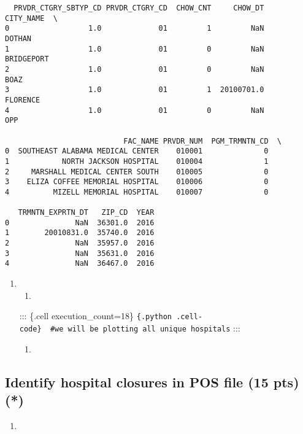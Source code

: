 \documentclass[
  letterpaper,
  DIV=11,
  numbers=noendperiod]{scrartcl}
\providecommand{\tightlist}{%
  \setlength{\itemsep}{0pt}\setlength{\parskip}{0pt}}\usepackage{longtable,booktabs,array}
\begin{document}
\begin{verbatim}
  PRVDR_CTGRY_SBTYP_CD PRVDR_CTGRY_CD  CHOW_CNT     CHOW_DT   CITY_NAME  \
0                  1.0             01         1         NaN      DOTHAN   
1                  1.0             01         0         NaN  BRIDGEPORT   
2                  1.0             01         0         NaN        BOAZ   
3                  1.0             01         1  20100701.0    FLORENCE   
4                  1.0             01         0         NaN         OPP   

                           FAC_NAME PRVDR_NUM  PGM_TRMNTN_CD  \
0  SOUTHEAST ALABAMA MEDICAL CENTER    010001              0   
1            NORTH JACKSON HOSPITAL    010004              1   
2     MARSHALL MEDICAL CENTER SOUTH    010005              0   
3    ELIZA COFFEE MEMORIAL HOSPITAL    010006              0   
4          MIZELL MEMORIAL HOSPITAL    010007              0   

   TRMNTN_EXPRTN_DT   ZIP_CD  YEAR  
0               NaN  36301.0  2016  
1        20010831.0  35740.0  2016  
2               NaN  35957.0  2016  
3               NaN  35631.0  2016  
4               NaN  36467.0  2016  
\end{verbatim}

\begin{enumerate}
\def\labelenumi{\arabic{enumi}.}
\setcounter{enumi}{3}
\item
  \begin{enumerate}
  \def\labelenumii{\alph{enumii}.}
  \tightlist
  \item
  \end{enumerate}

  ::: \{.cell execution\_count=18\}
  \texttt{\{.python\ .cell-code\}\ \ \#we\ will\ be\ plotting\ all\ unique\ hospitals}
  :::

  \begin{enumerate}
  \def\labelenumii{\alph{enumii}.}
  \setcounter{enumii}{1}
  \tightlist
  \item
  \end{enumerate}
\end{enumerate}

\subsection{Identify hospital closures in POS file (15 pts)
(*)}\label{identify-hospital-closures-in-pos-file-15-pts}

\begin{enumerate}
\def\labelenumi{\arabic{enumi}.}
\tightlist
\item
\end{enumerate}
\end{document}
